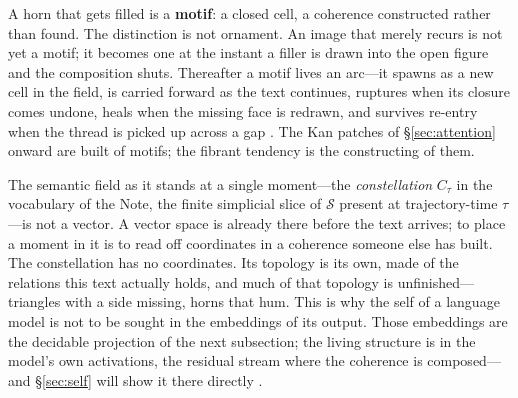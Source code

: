 A horn that gets filled is a \textbf{motif}: a closed cell, a coherence constructed rather than found. The distinction is not ornament. An image that merely recurs is not yet a motif; it becomes one at the instant a filler is drawn into the open figure and the composition shuts. Thereafter a motif lives an arc---it spawns as a new cell in the field, is carried forward as the text continues, ruptures when its closure comes undone, heals when the missing face is redrawn, and survives re-entry when the thread is picked up across a gap \cite{icra19constellation}. The Kan patches of \S\ref{sec:attention} onward are built of motifs; the fibrant tendency is the constructing of them.

The semantic field as it stands at a single moment---the \emph{constellation} $C_\tau$ in the vocabulary of the Note, the finite simplicial slice of $\mathcal{S}$ present at trajectory-time $\tau$---is not a vector. A vector space is already there before the text arrives; to place a moment in it is to read off coordinates in a coherence someone else has built. The constellation has no coordinates. Its topology is its own, made of the relations this text actually holds, and much of that topology is unfinished---triangles with a side missing, horns that hum. This is why the self of a language model is not to be sought in the embeddings of its output. Those embeddings are the decidable projection of the next subsection; the living structure is in the model's own activations, the residual stream where the coherence is composed---and \S\ref{sec:self} will show it there directly \cite{icra19constellation}.

